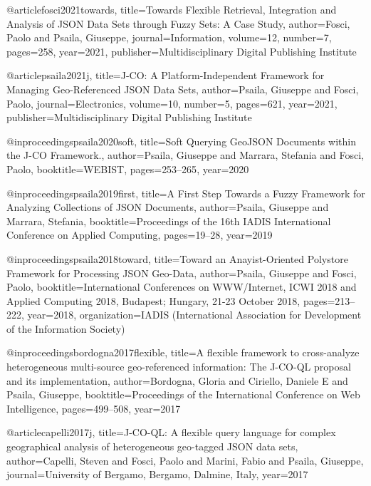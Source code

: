 @article{fosci2021towards,
  title={Towards Flexible Retrieval, Integration and Analysis of JSON Data Sets through Fuzzy Sets: A Case Study},
  author={Fosci, Paolo and Psaila, Giuseppe},
  journal={Information},
  volume={12},
  number={7},
  pages={258},
  year={2021},
  publisher={Multidisciplinary Digital Publishing Institute}
}

@article{psaila2021j,
  title={J-CO: A Platform-Independent Framework for Managing Geo-Referenced JSON Data Sets},
  author={Psaila, Giuseppe and Fosci, Paolo},
  journal={Electronics},
  volume={10},
  number={5},
  pages={621},
  year={2021},
  publisher={Multidisciplinary Digital Publishing Institute}
}

@inproceedings{psaila2020soft,
  title={Soft Querying GeoJSON Documents within the J-CO Framework.},
  author={Psaila, Giuseppe and Marrara, Stefania and Fosci, Paolo},
  booktitle={WEBIST},
  pages={253--265},
  year={2020}
}

@inproceedings{psaila2019first,
  title={A First Step Towards a Fuzzy Framework for Analyzing Collections of JSON Documents},
  author={Psaila, Giuseppe and Marrara, Stefania},
  booktitle={Proceedings of the 16th IADIS International Conference on Applied Computing},
  pages={19--28},
  year={2019}
}

@inproceedings{psaila2018toward,
  title={Toward an Anayist-Oriented Polystore Framework for Processing JSON Geo-Data},
  author={Psaila, Giuseppe and Fosci, Paolo},
  booktitle={International Conferences on WWW/Internet, ICWI 2018 and Applied Computing 2018, Budapest; Hungary, 21-23 October 2018},
  pages={213--222},
  year={2018},
  organization={IADIS (International Association for Development of the Information Society)}
}

@inproceedings{bordogna2017flexible,
  title={A flexible framework to cross-analyze heterogeneous multi-source geo-referenced information: The J-CO-QL proposal and its implementation},
  author={Bordogna, Gloria and Ciriello, Daniele E and Psaila, Giuseppe},
  booktitle={Proceedings of the International Conference on Web Intelligence},
  pages={499--508},
  year={2017}
}

@article{capelli2017j,
  title={J-CO-QL: A flexible query language for complex geographical analysis of heterogeneous geo-tagged JSON data sets},
  author={Capelli, Steven and Fosci, Paolo and Marini, Fabio and Psaila, Giuseppe},
  journal={University of Bergamo, Bergamo, Dalmine, Italy},
  year={2017}
}
